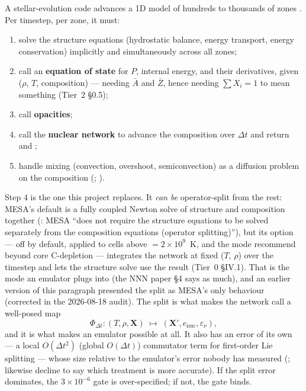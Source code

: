 A stellar-evolution code advances a 1D model of hundreds to thousands of zones
\citep[\S 6.1]{paxton2011}. Per timestep, per zone, it must:

\begin{enumerate}
\item solve the structure equations (hydrostatic balance, energy transport,
  energy conservation) implicitly and simultaneously across all zones;
\item call an \textbf{equation of state} for $P$, internal energy, and their
  derivatives, given ($\rho$, $T$, composition) --- needing $\bar A$ and
  $\bar Z$, hence needing $\sum X_i = 1$ to mean something (Tier~2 \S 0.5);
\item call \textbf{opacities};
\item call the \textbf{nuclear network} to advance the composition over
  $\Delta t$ and return \enuc{} and \epsnu{};
\item handle mixing (convection, overshoot, semiconvection) as a diffusion
  problem on the composition (\citealt[\S 6]{paxton2011}; \citealt{jermyn2023}).
\end{enumerate}

Step 4 is the one this project replaces. It \emph{can be} operator-split from
the rest: MESA's default is a fully coupled Newton solve of structure and
composition together (\citealt[\S 6.1]{paxton2011}: MESA ``does not require the
structure equations to be solved separately from the composition equations
(operator splitting)''), but its  option --- off by
default, applied to cells above  $= 2 \times
10^{9}$~K, and the mode \citet[\S 10.2]{jermyn2023} recommend beyond core
C-depletion --- integrates the network at fixed ($T$, $\rho$) over the timestep
and lets the structure solve use the result (Tier~0 \S IV.1). That is the mode
an emulator plugs into (the NNN paper \S 4 says as much), and an earlier
version of this paragraph presented the split as MESA's only behaviour
(corrected in the 2026-08-18 audit). The split is what makes the network call
a well-posed map
%
\begin{equation}
\Phi_{\Delta t}:(T,\rho,\mathbf X)\;\longmapsto\;(\mathbf X', e_{\mathrm{nuc}},
\varepsilon_\nu),
\label{eq:hostmap}
\end{equation}
%
and it is what makes an emulator possible at all. It also has an error of its
own --- a local $O(\Delta t^2)$ (global $O(\Delta t)$) commutator term for
first-order Lie splitting \citep{hairer1996} --- whose size relative to the
emulator's error nobody has measured (;
\citealt[\S 10.2]{jermyn2023} likewise decline to say which treatment is more
accurate). If the split error dominates, the $3 \times 10^{-6}$ gate is
over-specified; if not, the gate binds.

